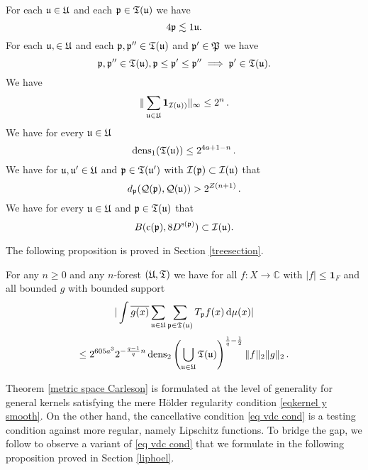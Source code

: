 For each $\mathfrak u\in \mathfrak U$ and each $\mathfrak p\in \mathfrak T(\mathfrak u)$
we have
\begin{equation}\label{forest1}
4\mathfrak p\lesssim 1\mathfrak u.
\end{equation}
For each $\mathfrak u, \in \mathfrak U$ and each $\mathfrak p,\mathfrak p''\in \mathfrak T(\mathfrak u)$ and $\mathfrak p'\in \mathfrak P$
we have
\begin{equation}\label{forest2}
    \mathfrak p, \mathfrak p'' \in \mathfrak{T}(\mathfrak u), \mathfrak p \leq \mathfrak p' \leq \mathfrak p'' \implies \mathfrak p' \in \mathfrak{T}(\mathfrak u).
\end{equation}
We have
\begin{equation}\label{forest3}
   \|\sum_{\mathfrak u\in \mathfrak U} \mathbf{1}_{\mathcal{I}(\mathfrak u))}\|_\infty \leq 2^n\,.
\end{equation}
We have for every $\mathfrak u\in \mathfrak U$
\begin{equation}\label{forest4}
\operatorname{\operatorname{dens}}_1(\mathfrak T(\mathfrak u))\le 2^{4a + 1-n}\, .
\end{equation}
We have for $\mathfrak u, \mathfrak u'\in \mathfrak U$ and $\mathfrak p\in \mathfrak T(\mathfrak u')$ with $\mathcal{I}(\mathfrak p)\subset \mathcal{I}(\mathfrak u)$ that
\begin{equation}\label{forest5}
d_{\mathfrak p}(\mathcal{Q}(\mathfrak p), \mathcal{Q}(\mathfrak u))>2^{Z(n+1)}\, .
\end{equation}
We have for every $\mathfrak u\in \mathfrak U$ and $\mathfrak p\in \mathfrak T(\mathfrak u)$ that
\begin{equation}\label{forest6}
B(\mathrm{c}(\mathfrak p), 8D^{\mathrm{s}(\mathfrak p)})\subset \mathcal{I}(\mathfrak u).
\end{equation}


The following proposition is proved in Section \ref{treesection}.
\begin{prop}\label{forest operator}
For any $n\ge 0$ and any $n$-forest $(\mathfrak U,\mathfrak T)$ we have for all $f: X \to \mathbb{C}$ with $|f| \le \mathbf{1}_F$ and all bounded $g$ with bounded support
$$
    | \int \overline{g(x)} \sum_{\mathfrak u\in \mathfrak U} \sum_{\mathfrak p\in \mathfrak T(\mathfrak u)} T_{\mathfrak p} f(x) \, \mathrm{d}\mu(x)|
$$
$$
    \le %
    2^{605a^3}2^{-\frac{q-1}{q} n} \dens_2\left(\bigcup_{\fu\in \fU}\fT(\fu)\right)^{\frac{1}{q}-\frac{1}{2}} \|f\|_2 \|g\|_2 \,.
$$
 
\end{prop}

Theorem \ref{metric space Carleson} is formulated at the level of generality
for general kernels satisfying the mere H\"older regularity condition \eqref{eqkernel y smooth}. On the other hand, the cancellative condition \eqref{eq vdc cond} is a testing condition against more regular,
namely Lipschitz functions. To bridge the gap, we follow \cite{zk-polynomial} to observe a variant of \eqref{eq vdc cond} that we formulate
in the following proposition proved in Section \ref{liphoel}.



